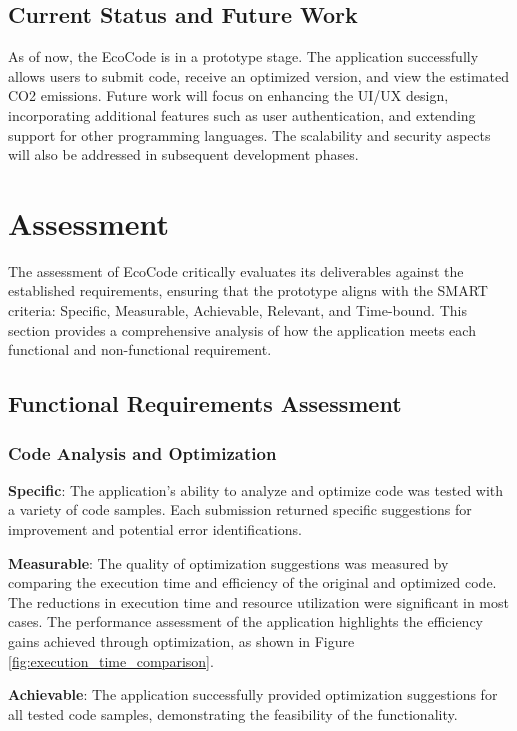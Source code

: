 \documentclass[conference,compsoc]{IEEEtran}
\begin{document}
\subsection{Current Status and Future Work}
As of now, the EcoCode is in a prototype stage. The application successfully allows users to submit  code, receive an optimized version, and view the estimated CO2 emissions. Future work will focus on enhancing the UI/UX design, incorporating additional features such as user authentication, and extending support for other programming languages. The scalability and security aspects will also be addressed in subsequent development phases.

\section{Assessment}
The assessment of EcoCode critically evaluates its deliverables against the established requirements, ensuring that the prototype aligns with the SMART criteria: Specific, Measurable, Achievable, Relevant, and Time-bound. This section provides a comprehensive analysis of how the application meets each functional and non-functional requirement.

\subsection{Functional Requirements Assessment}
\subsubsection{Code Analysis and Optimization}

\textbf{Specific}: The application's ability to analyze and optimize  code was tested with a variety of code samples. Each submission returned specific suggestions for improvement and potential error identifications.

\textbf{Measurable}: The quality of optimization suggestions was measured by comparing the execution time and efficiency of the original and optimized code. The reductions in execution time and resource utilization were significant in most cases. The performance assessment of the application highlights the efficiency gains achieved through optimization, as shown in Figure \ref{fig:execution_time_comparison}.

\textbf{Achievable}: The application successfully provided optimization suggestions for all tested code samples, demonstrating the feasibility of the functionality.
\end{document}
